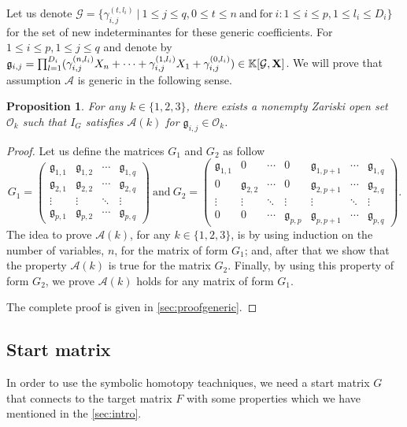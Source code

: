 \documentclass[11pt]{article}
\numberwithin{Property}{section}
\numberwithin{Theorem}{section}
\newtheorem{Proposition}{Proposition}%
\numberwithin{Proposition}{section}
\numberwithin{Lemma}{section}
\numberwithin{Corollary}{section}
\numberwithin{Definition}{section}
\numberwithin{Remark}{section}
\numberwithin{Conjecture}{section}
\numberwithin{Problem}{section}
\numberwithin{Claim}{section}
\theoremstyle{definition}
\numberwithin{Example}{section}
\renewcommand{\leq}{\leqslant}
\newcommand{\field}{\mathbb{K}} %
\newcommand{\improve}[1]{\textcolor{blue}{#1}} %
\begin{document}
Let us denote $\mathcal{G} = \{\gamma_{i,j}^{(t,l_i)} \ | \ 1 \leq j \leq q, 0 \leq t \leq n \ \mathrm{and} \ \mathrm{for} \ i : 1 \leq i \leq p, 1 \leq l_i \leq D_i\}$ for the set of new indeterminantes for these generic coefficients. For $1 \leq i \leq p, 1 \leq j \leq q$ and denote by $\mathfrak{g}_{i,j} = \prod_{l=1}^{D_i}(\gamma_{i,j}^{(n,l_i)}X_n + \cdots + \gamma_{i,j}^{(1,l_i)}X_1 + \gamma_{i,j}^{(0,l_i)}) \in \field[\mathcal{G}, \bf{X}]$. We will prove that assumption $\mathcal{A}$ is generic in the following sense. 
\begin{Proposition} \label{generic}For any $k \in \{1,2,3\}$, there exists a nonempty Zariski open set $\mathcal{O}_k$ such that $I_G$ satisfies $\mathcal{A}(k)$ for $\mathfrak{g}_{i,j} \in \mathcal{O}_k$. 
\end{Proposition}
\begin{proof}
Let us define the matrices $G_1$ and $G_2$ as follow
\[G_1 = \left( \begin{matrix}
\mathfrak{g}_{1,1} & \mathfrak{g}_{1,2} & \cdots  & \mathfrak{g}_{1, q}\\
\mathfrak{g}_{2,1} & \mathfrak{g}_{2,2} & \cdots  & \mathfrak{g}_{2, q}\\
\vdots & \vdots & \ddots & \vdots \\
\mathfrak{g}_{p,1} & \mathfrak{g}_{p,2} & \cdots  & \mathfrak{g}_{p, q}
\end{matrix} \right) \ \mathrm{and} \ 
 G_2 = \left( \begin{matrix}
\mathfrak{g}_{1,1} & 0 & \cdots & 0 & \mathfrak{g}_{1,p+1} & \cdots & \mathfrak{g}_{1, q}\\
0 & \mathfrak{g}_{2,2} & \cdots & 0 & \mathfrak{g}_{2,p+1} & \cdots & \mathfrak{g}_{2, q}\\
\vdots & \vdots & \ddots & \vdots & \vdots & \ddots & \vdots\\
0 & 0 & \cdots & \mathfrak{g}_{p,p} & \mathfrak{g}_{p,p+1} & \cdots & \mathfrak{g}_{p, q}
\end{matrix} \right). \] 
The idea to prove $\mathcal{A}(k)$, for any $k \in \{1,2,3\}$, is by using induction on the number of variables, $n$, for the matrix of form $G_1$; and, after that we show that the property $\mathcal{A}(k)$ is true for the matrix $G_2$. Finally, by using this property of form $G_2$, we prove  $\mathcal{A}(k)$ holds for any matrix of form $G_1$.

The complete proof is given in \improve{\cref{sec:proofgeneric}}. 
\end{proof}
\subsection{Start matrix}
In order to use the symbolic homotopy teachniques, we need a start matrix $G$ that connects to the target matrix $F$ with some properties which we have mentioned in the \improve{\cref{sec:intro}}. 
\end{document}
